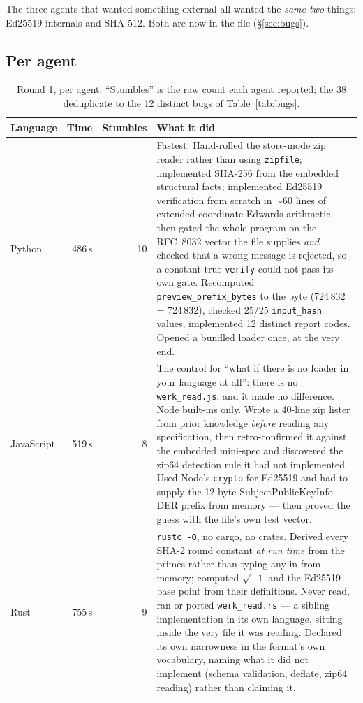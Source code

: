 \documentclass[10pt,twocolumn,letterpaper]{article}
\newcommand{\code}[1]{\texttt{\small #1}}
\begin{document}
The three agents that wanted something external all wanted the \emph{same two}
things: Ed25519 internals and SHA-512. Both are now in the file
(\S\ref{sec:bugs}).

\subsection{Per agent}

\begin{table}[t]
\caption{Round 1, per agent. ``Stumbles'' is the raw count each agent reported;
the 38 deduplicate to the 12 distinct bugs of Table~\ref{tab:bugs}.}
\label{tab:r1agents}
\small
\begin{tabular}{@{}lrrL{11.2cm}@{}}
\toprule
Language & Time & Stumbles & What it did \\
\midrule
Python & 486\,s & 10 & Fastest. Hand-rolled the store-mode zip reader rather than using \code{zipfile}; implemented SHA-256 from the embedded structural facts; implemented Ed25519 verification from scratch in $\sim$60 lines of extended-coordinate Edwards arithmetic, then gated the whole program on the RFC~8032 vector the file supplies \emph{and} checked that a wrong message is rejected, so a constant-true \code{verify} could not pass its own gate. Recomputed \code{preview\_prefix\_bytes} to the byte (724\,832 = 724\,832), checked 25/25 \code{input\_hash} values, implemented 12 distinct report codes. Opened a bundled loader once, at the very end. \\
JavaScript & 519\,s & 8 & The control for ``what if there is no loader in your language at all'': there is no \code{werk\_read.js}, and it made no difference. Node built-ins only. Wrote a 40-line zip lister from prior knowledge \emph{before} reading any specification, then retro-confirmed it against the embedded mini-spec and discovered the zip64 detection rule it had not implemented. Used Node's \code{crypto} for Ed25519 and had to supply the 12-byte SubjectPublicKeyInfo DER prefix from memory --- then proved the guess with the file's own test vector. \\
Rust & 755\,s & 9 & \code{rustc -O}, no cargo, no crates. Derived every SHA-2 round constant \emph{at run time} from the primes rather than typing any in from memory; computed $\sqrt{-1}$ and the Ed25519 base point from their definitions. Never read, ran or ported \code{werk\_read.rs} --- a sibling implementation in its own language, sitting inside the very file it was reading. Declared its own narrowness in the format's own vocabulary, naming what it did not implement (schema validation, deflate, zip64 reading) rather than claiming it. \\

\end{tabular}
\end{table}
\end{document}
